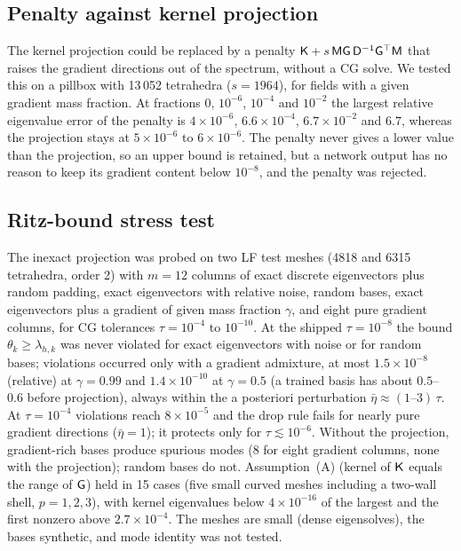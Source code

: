 \subsection{Penalty against kernel projection}\label{sec:A07-penalty}
The kernel projection could be replaced by a penalty $\mathsf{K}+s\,\mathsf{M}\mathsf{G}\,\mathsf{D}^{-1}\mathsf{G}^{\top}\mathsf{M}$ that raises the gradient directions out of the spectrum, without a CG solve. We tested this on a pillbox with 13\,052 tetrahedra ($s=1964$), for fields with a given gradient mass fraction.
At fractions $0$, $10^{-6}$, $10^{-4}$ and $10^{-2}$ the largest relative eigenvalue error of the penalty is $4\times10^{-6}$, $6.6\times10^{-4}$, $6.7\times10^{-2}$ and $6.7$, whereas the projection stays at $5\times10^{-6}$ to $6\times10^{-6}$.
The penalty never gives a lower value than the projection, so an upper bound is retained, but a network output has no reason to keep its gradient content below $10^{-8}$, and the penalty was rejected.


\subsection{Ritz-bound stress test}\label{sec:A07-ritz}
The inexact projection was probed on two LF test meshes (4818 and 6315 tetrahedra, order 2) with $m=12$ columns of exact discrete eigenvectors plus random padding, exact eigenvectors with relative noise, random bases, exact eigenvectors plus a gradient of given mass fraction $\gamma$, and eight pure gradient columns, for CG tolerances $\tau=10^{-4}$ to $10^{-10}$. At the shipped $\tau=10^{-8}$ the bound $\theta_k\ge\lambda_{h,k}$ was never violated for exact eigenvectors with noise or for random bases; violations occurred only with a gradient admixture, at most $1.5\times10^{-8}$ (relative) at $\gamma=0.99$ and $1.4\times10^{-10}$ at $\gamma=0.5$ (a trained basis has about $0.5$--$0.6$ before projection), always within the a posteriori perturbation $\bar\eta\approx(1\text{--}3)\,\tau$. At $\tau=10^{-4}$ violations reach $8\times10^{-5}$ and the drop rule fails for nearly pure gradient directions ($\bar\eta=1$); it protects only for $\tau\lesssim10^{-6}$. Without the projection, gradient-rich bases produce spurious modes (8 for eight gradient columns, none with the projection); random bases do not. Assumption~(A) (kernel of $\mathsf{K}$ equals the range of $\mathsf{G}$) held in 15 cases (five small curved meshes including a two-wall shell, $p=1,2,3$), with kernel eigenvalues below $4\times10^{-16}$ of the largest and the first nonzero above $2.7\times10^{-4}$. The meshes are small (dense eigensolves), the bases synthetic, and mode identity was not tested.

